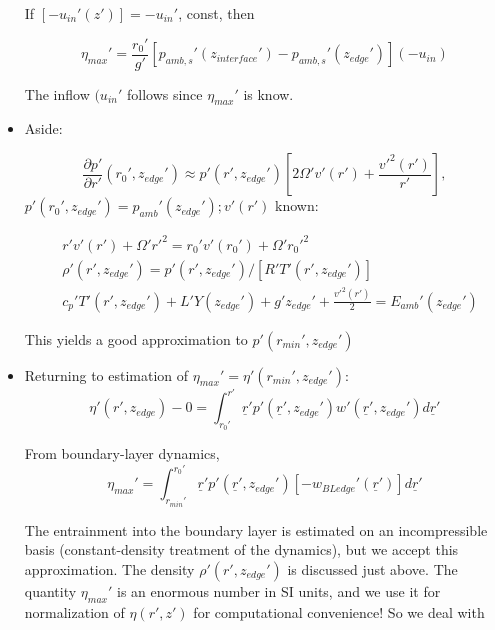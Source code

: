 \documentclass{article}
\begin{document}
\begin{itemize}
If $[-u_{in}'(z')] = -u_{in}'$, const, then

\begin{equation}
	\eta_{max}' = \frac{r_0'}{g'} \left [ p_{amb,s}'(z_{interface}') - p_{amb,s}'(z_{edge}')\right ] (-u_{in})
\end{equation}

The inflow $(u_{in}'$ follows since $\eta_{max}'$ is know.

\item Aside: 

\begin{equation}
	\frac{\partial p'}{\partial r'}(r_0', z_{edge}') \approx p'(r',z_{edge}') \left [ 2 \Omega' v'(r') + \frac{v'^2(r')}{r'} \right ], 
\end{equation}
$p'(r_0', z_{edge}') = p_{amb}'(z_{edge}'); v'(r')$ known:

\begin{equation}
\begin{split}
	&r'v'(r') + \Omega' r'^2 = r_0' v'(r_0') + \Omega' r_0'^2 \\
	&\rho'(r', z_{edge}') = p'(r',z_{edge}') /[R' T'(r',z_{edge}')]\\
	&c_p' T'(r',z_{edge}') + L'Y(z_{edge}') + g'z_{edge}' + \frac{v'^2(r')}{2} = E_{amb}'(z_{edge}')
\end{split}
\end{equation}

This yields a good approximation to $p'(r_{min}', z_{edge}')$

\item Returning to estimation of $\eta_{max}' = \eta'(r_{min}', z_{edge}')$:
\begin{equation}
	\eta'(r',z_{edge}) - 0 = \int_{r_0'}^{r'} \underline{r}' p'(\underline{r}', z_{edge}') w'(\underline{r}', z_{edge}') d\underline{r}'
\end{equation}

From boundary-layer dynamics,
\begin{equation}
	\eta_{max}' = \int_{r_{min}'}^{r_0'} \underline{r}' p'(\underline{r}', z_{edge}')\left [ -w_{BL edge}'(\underline{r}')\right ] d\underline{r}'
\end{equation}

The entrainment into the boundary layer is estimated on an incompressible basis (constant-density treatment of the dynamics), but we accept this approximation. The density $\rho'(r',z_{edge}')$ is discussed just above. The quantity $\eta_{max}'$ is an enormous number in SI units, and we use it for normalization of $\eta(r',z')$ for computational convenience! So we deal with 


\end{itemize}
\end{document}
